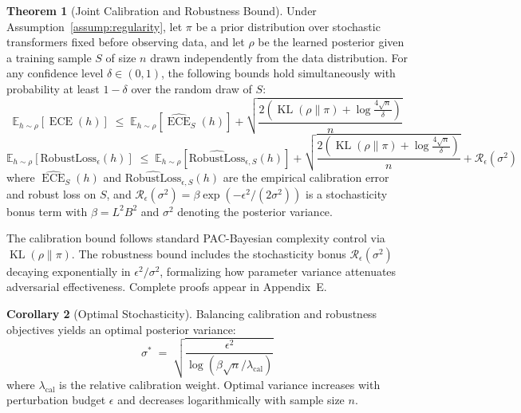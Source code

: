 \documentclass[12pt,a4paper]{article}
\theoremstyle{definition}
\newtheorem{theorem}{Theorem}[section]
\newtheorem{corollary}[theorem]{Corollary}
\DeclareMathOperator{\ECE}{ECE}
\DeclareMathOperator{\KL}{KL}
\begin{document}
\begin{theorem}[Joint Calibration and Robustness Bound]
\label{thm:joint_bound}
Under Assumption~\ref{assump:regularity}, let $\pi$ be a prior distribution over stochastic transformers fixed before observing data, and let $\rho$ be the learned posterior given a training sample $S$ of size $n$ drawn independently from the data distribution. For any confidence level $\delta \in (0,1)$, the following bounds hold simultaneously with probability at least $1-\delta$ over the random draw of $S$:
\begin{equation}
\label{eq:calibration_bound}
\mathbb{E}_{h\sim\rho}[\ECE(h)]
\;\le\;\mathbb{E}_{h\sim\rho}[\widehat{\ECE}_S(h)]
+\sqrt{\frac{2(\KL(\rho\|\pi)+\log\frac{4\sqrt{n}}{\delta})}{n}}
\end{equation}
\begin{equation}
\label{eq:robustness_bound}
\mathbb{E}_{h\sim\rho}[\text{RobustLoss}_\epsilon(h)]
\;\le\;\mathbb{E}_{h\sim\rho}[\widehat{\text{RobustLoss}}_{\epsilon,S}(h)]
+\sqrt{\frac{2(\KL(\rho\|\pi)+\log\frac{4\sqrt{n}}{\delta})}{n}}
+\mathcal{R}_\epsilon(\sigma^2)
\end{equation}
where $\widehat{\ECE}_S(h)$ and $\widehat{\text{RobustLoss}}_{\epsilon,S}(h)$ are the empirical calibration error and robust loss on $S$, and $\mathcal{R}_\epsilon(\sigma^2) = \beta \exp(-\epsilon^2/(2\sigma^2))$ is a stochasticity bonus term with $\beta = L^2 B^2$ and $\sigma^2$ denoting the posterior variance.
\end{theorem}

The calibration bound follows standard PAC-Bayesian complexity control via $\KL(\rho\|\pi)$. The robustness bound includes the stochasticity bonus $\mathcal{R}_\epsilon(\sigma^2)$ decaying exponentially in $\epsilon^2/\sigma^2$, formalizing how parameter variance attenuates adversarial effectiveness. Complete proofs appear in Appendix~E.

\begin{corollary}[Optimal Stochasticity]
\label{cor:optimal_stochasticity}
Balancing calibration and robustness objectives yields an optimal posterior variance:
\begin{equation}
\sigma^*\;=\;\sqrt{\frac{\epsilon^2}{\log(\beta\sqrt{n}/\lambda_{\text{cal}})}}
\end{equation}
where $\lambda_{\text{cal}}$ is the relative calibration weight. Optimal variance increases with perturbation budget $\epsilon$ and decreases logarithmically with sample size $n$.
\end{corollary}
\end{document}
